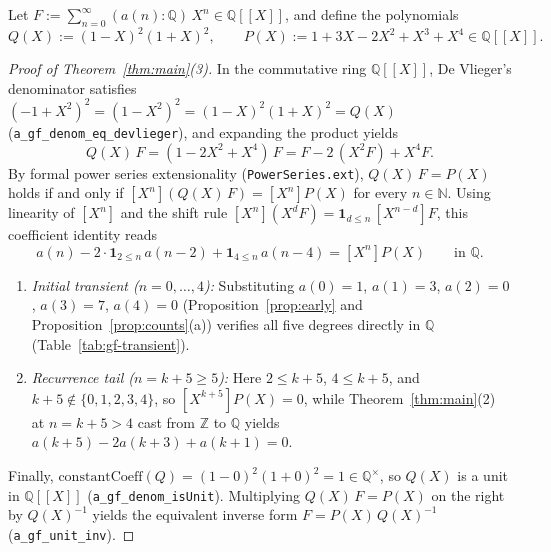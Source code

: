 \documentclass[11pt]{article}
\newcommand{\llbracket}{[\![}
\newcommand{\rrbracket}{]\!]}
\theoremstyle{definition}
\newcommand{\N}{\mathbb{N}}
\newcommand{\Z}{\mathbb{Z}}
\newcommand{\Q}{\mathbb{Q}}
\begin{document}
Let $F := \sum_{n=0}^{\infty} (a(n) : \Q)\,X^n \in \Q\llbracket X \rrbracket$, and define the polynomials
\[
Q(X) := (1 - X)^2 (1 + X)^2, \qquad P(X) := 1 + 3X - 2X^2 + X^3 + X^4 \in \Q\llbracket X \rrbracket.
\]

\begin{proof}[Proof of Theorem~\ref{thm:main}(3)]
In the commutative ring $\Q\llbracket X \rrbracket$, De Vlieger's denominator satisfies $(-1 + X^2)^2 = (1 - X^2)^2 = (1 - X)^2(1 + X)^2 = Q(X)$ (\texttt{a\_gf\_denom\_eq\_devlieger}), and expanding the product yields
\[
Q(X)\,F = (1 - 2X^2 + X^4)\,F = F - 2\,(X^2 F) + X^4 F.
\]
By formal power series extensionality (\texttt{PowerSeries.ext}), $Q(X)\,F = P(X)$ holds if and only if $[X^n](Q(X)\,F) = [X^n]P(X)$ for every $n \in \N$. Using linearity of $[X^n]$ and the shift rule $[X^n](X^d F) = \mathbf{1}_{d \le n}\,[X^{n - d}]F$, this coefficient identity reads
\begin{equation}
\label{eq:coeff-goal}
a(n) - 2\cdot\mathbf{1}_{2 \le n}\,a(n - 2) + \mathbf{1}_{4 \le n}\,a(n - 4) = [X^n]P(X) \qquad \text{in } \Q.
\end{equation}
\begin{enumerate}
\item \emph{Initial transient ($n = 0, \dots, 4$):} Substituting $a(0) = 1$, $a(1) = 3$, $a(2) = 0$, $a(3) = 7$, $a(4) = 0$ (Proposition~\ref{prop:early} and Proposition~\ref{prop:counts}(a)) verifies all five degrees directly in $\Q$ (Table~\ref{tab:gf-transient}).
\item \emph{Recurrence tail ($n = k + 5 \ge 5$):} Here $2 \le k + 5$, $4 \le k + 5$, and $k + 5 \notin \{0, 1, 2, 3, 4\}$, so $[X^{k+5}]P(X) = 0$, while Theorem~\ref{thm:main}(2) at $n = k + 5 > 4$ cast from $\Z$ to $\Q$ yields $a(k + 5) - 2a(k + 3) + a(k + 1) = 0$.
\end{enumerate}
Finally, $\mathrm{constantCoeff}(Q) = (1 - 0)^2(1 + 0)^2 = 1 \in \Q^\times$, so $Q(X)$ is a unit in $\Q\llbracket X \rrbracket$ (\texttt{a\_gf\_denom\_isUnit}). Multiplying $Q(X)\,F = P(X)$ on the right by $Q(X)^{-1}$ yields the equivalent inverse form $F = P(X)\,Q(X)^{-1}$ (\texttt{a\_gf\_unit\_inv}).
\end{proof}
\end{document}
